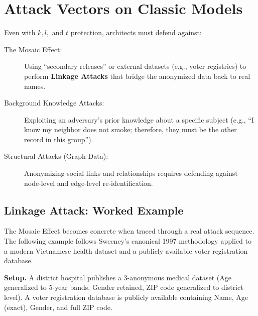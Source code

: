 \section{Attack Vectors on Classic Models}
\label{sec:attack_vectors_classic}

Even with $k, l,$ and $t$ protection, architects must defend against:
\begin{description}
  \item[The Mosaic Effect:] Using ``secondary releases'' or external datasets (e.g., voter registries) to perform \textbf{Linkage Attacks} that bridge the anonymized data back to real names.
  \item[Background Knowledge Attacks:] Exploiting an adversary's prior knowledge about a specific subject (e.g., ``I know my neighbor does not smoke; therefore, they must be the other record in this group'').
  \item[Structural Attacks (Graph Data):] Anonymizing social links and relationships requires defending against node-level and edge-level re-identification.
\end{description}

\subsection{Linkage Attack: Worked Example}
\label{subsec:linkage_worked_example}

The Mosaic Effect becomes concrete when traced through a real attack sequence. The following example follows Sweeney's canonical 1997 methodology \cite{sweeney2002} applied to a modern Vietnamese health dataset and a publicly available voter registration database.

\textbf{Setup.} A district hospital publishes a 3-anonymous medical dataset (Age generalized to 5-year bands, Gender retained, ZIP code generalized to district level). A voter registration database is publicly available containing Name, Age (exact), Gender, and full ZIP code.

